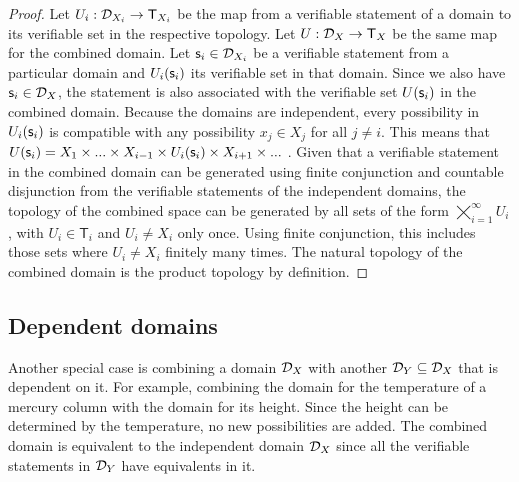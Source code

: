 \documentclass[11pt,letterpaper,fleqn]{memoir} %
\begin{document}
\begin{mathSection}
	\begin{proof}
		Let $U_i : \mathcal{D}_{X_i} \to \mathsf{T}_{X_i}$ be the map from a verifiable statement of a domain to its verifiable set in the respective topology. Let $U : \mathcal{D}_{X} \to \mathsf{T}_X$ be the same map for the combined domain. Let $\mathsf{s}_i \in \mathcal{D}_{X_i}$ be a verifiable statement from a particular domain and $U_i(\mathsf{s}_i)$ its verifiable set in that domain. Since we also have $\mathsf{s}_i \in \mathcal{D}_{X}$, the statement is also associated with the verifiable set $U(\mathsf{s}_i)$ in the combined domain. Because the domains are independent, every possibility in $U_i(\mathsf{s}_i)$ is compatible with any possibility $x_j \in X_j$ for all $j \neq i$. This means that $U(\mathsf{s}_i)=X_1\times ... \times X_{i-1} \times U_i(\mathsf{s}_i) \times X_{i+1} \times ...$ . Given that a verifiable statement in the combined domain can be generated using finite conjunction and countable disjunction from the verifiable statements of the independent domains, the topology of the combined space can be generated by all sets of the form $\bigtimes\limits_{i=1}^{\infty} U_{i}$, with $U_i \in \mathsf{T}_i$ and $U_i \neq X_i$ only once. Using finite conjunction, this includes those sets where $U_i \neq X_i$ finitely many times. The natural topology of the combined domain is the product topology by definition.
	\end{proof}
\end{mathSection}

\subsection{Dependent domains}

Another special case is combining a domain $\mathcal{D}_X$ with another $\mathcal{D}_Y \subseteq \mathcal{D}_X$ that is dependent on it. For example, combining the domain for the temperature of a mercury column with the domain for its height. Since the height can be determined by the temperature, no new possibilities are added. The combined domain is equivalent to the independent domain $\mathcal{D}_X$ since all the verifiable statements in $\mathcal{D}_Y$ have equivalents in it.
\end{document}
